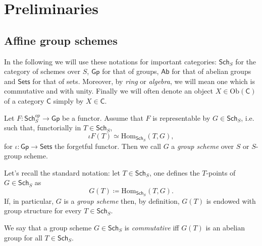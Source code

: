 \documentclass[../Main]{subfiles}
\begin{document}
\chapter{Preliminaries}
\section{Affine group schemes}
In the following we will use these notations for important categories:
$\mathsf{Sch}_{S}$ for the category of schemes over $S$,
$\mathsf{Gp}$ for that of groups,
$\mathsf{Ab}$ for that of abelian groups
and $\mathsf{Sets}$ for that of sets.
Moreover, by {\em ring} or {\em algebra}, we will mean one which is commutative and with unity.
Finally we will often denote an object $X \in \mathrm{Ob} \left(\mathsf{C}\right)$ 
of a category $\mathsf{C}$ simply by $X \in \mathsf{C}$.
\begin{defn}
	Let $F\colon \mathsf{Sch}_S^{op} \to \mathsf{Gp}$ be a functor.
	Assume that $F$ is representable by $G \in \mathsf{Sch}_{ S }$, i.e. such that, 
	functorially in $T \in \mathsf{Sch}_{ S }$,
	\begin{equation}
		\iota F(T) \simeq \mathrm{Hom}_{\mathsf{Sch}_S} \left( T, G \right)
	,\end{equation} 
	for $\iota\colon \mathsf{Gp} \to \mathsf{Sets}$ the forgetful functor.
	Then we call $G$ a {\em group scheme} over $S$
	or $S$-group scheme.
\end{defn}

\begin{rem}
	Let's recall the standard notation: let $T \in \mathsf{Sch}_{ S }$, one defines
	the $T$-points of $G \in \mathsf{Sch}_{ S }$ as
	\begin{equation}
		G(T) \coloneqq \mathrm{Hom}_{\mathsf{Sch}_{ S }} \left( T, G \right)
	.\end{equation} 
	If, in particular, $G$ is a {\em group scheme} then, by definition,
	$G(T)$ is endowed with group structure for every $T \in \mathsf{Sch}_{ S }$.
\end{rem}

\begin{defn}
	We say that a group scheme $G \in \mathsf{Sch}_{ S }$ is {\em commutative}
	iff $G(T)$ is an abelian group for all $T \in \mathsf{Sch}_{ S }$.
\end{defn}
\end{document}
